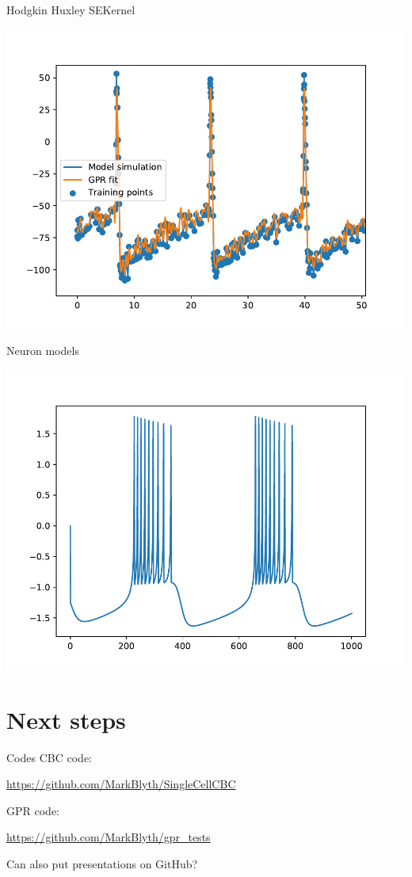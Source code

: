 \documentclass[presentation]{beamer}
\begin{document}
\begin{frame}[plain,label={sec:orge2a730d}]{Hodgkin Huxley SEKernel}
\begin{center}
\includegraphics[width=\textwidth]{./HH_noise.pdf}
\end{center}
\end{frame}

\begin{frame}[plain,label={sec:org289d05f}]{Neuron models}
\begin{center}
\includegraphics[width=\textwidth]{./clean_HR.pdf}
\end{center}
\end{frame}

\section{Next steps}
\label{sec:org522a746}
\begin{frame}[label={sec:orgfd2a10e}]{Codes}
CBC code:

\url{https://github.com/MarkBlyth/SingleCellCBC}

\vfill
GPR code:

\url{https://github.com/MarkBlyth/gpr\_tests}

\vfill

Can also put presentations on GitHub?
\end{frame}
\end{document}

